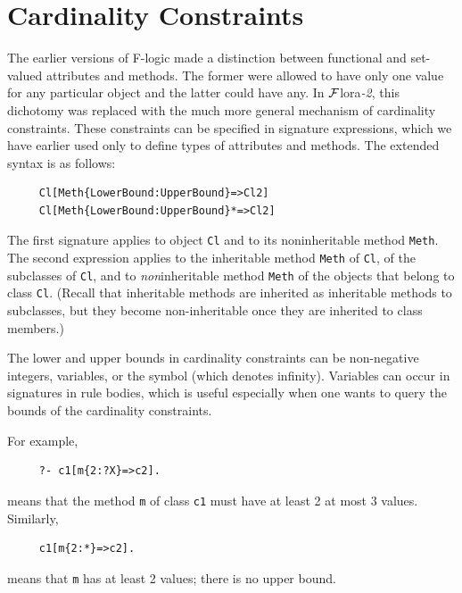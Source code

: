 \documentclass[11pt]{article}
\newcommand{\FLORA}{{\mbox{\sc ${\cal F}${lora}\rm\emph{-2}}}\xspace}
\begin{document}
\section{Cardinality Constraints}\label{sec-card-in-signatures}

The earlier versions of F-logic made a distinction between functional and
set-valued attributes and methods. The former were allowed to have only one
value for any particular object and the latter could have any. In \FLORA,
this dichotomy was replaced with the much more general mechanism of
cardinality constraints. These constraints can be specified in signature
expressions, which we have earlier used only to define types of attributes
and methods. The extended syntax is as follows:
\begin{verbatim}
     Cl[Meth{LowerBound:UpperBound}=>Cl2]
     Cl[Meth{LowerBound:UpperBound}*=>Cl2]
\end{verbatim}
The first signature applies to object {\tt Cl} and to its noninheritable
method {\tt Meth}. The second expression applies to the inheritable
method {\tt Meth}  of {\tt Cl}, of the subclasses of {\tt Cl},
and to \emph{non}inheritable method {\tt Meth} of the objects that belong
to class {\tt Cl}. (Recall that inheritable methods are inherited as
inheritable methods to subclasses, but they become non-inheritable once
they are inherited to class members.)

The lower and upper bounds in cardinality constraints can be non-negative
integers, variables, or the symbol {\tt *} (which denotes
infinity). Variables can occur in signatures in rule bodies, which is
useful especially when one wants to query the bounds of the cardinality
constraints.

For example,
\begin{verbatim}
     ?- c1[m{2:?X}=>c2].
\end{verbatim}
means that the method {\tt m}  of class {\tt c1} must have at least 2 at
most 3 values. Similarly,
\begin{verbatim}
     c1[m{2:*}=>c2]. 
\end{verbatim}
means that {\tt m}  has at least 2 values; there is no upper bound.
\end{document}
